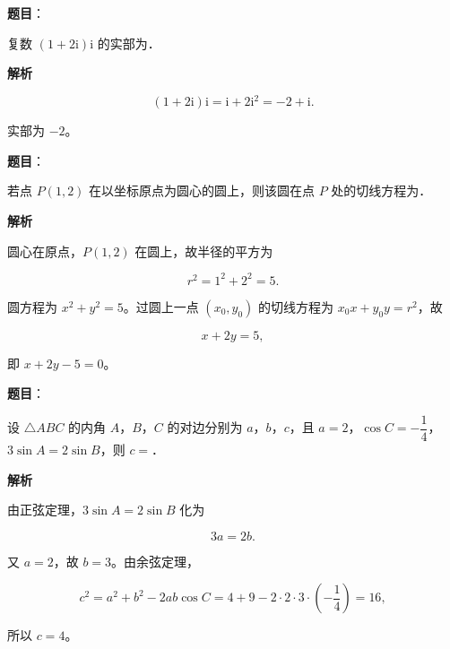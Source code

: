 \begin{answer}

\textbf{题目}：

复数 $(1+2\mathrm{i})\mathrm{i}$ 的实部为\gkblank{}．

\textbf{解析}

\nopagebreak[4]
\[
(1+2\mathrm{i})\mathrm{i}=\mathrm{i}+2\mathrm{i}^{2}=-2+\mathrm{i}.
\]

实部为 $-2$。


\end{answer}
\begin{answer}

\textbf{题目}：

若点 $P(1,2)$ 在以坐标原点为圆心的圆上，则该圆在点 $P$ 处的切线方程为\gkblank{}．

\textbf{解析}

圆心在原点，$P(1,2)$ 在圆上，故半径的平方为

\nopagebreak[4]
\[
r^{2}=1^{2}+2^{2}=5.
\]

圆方程为 $x^{2}+y^{2}=5$。过圆上一点 $(x_{0},y_{0})$ 的切线方程为 $x_{0}x+y_{0}y=r^{2}$，故

\nopagebreak[4]
\[
x+2y=5,
\]

即 $x+2y-5=0$。


\end{answer}
\begin{answer}

\textbf{题目}：

设 $\triangle ABC$ 的内角 $A$，$B$，$C$ 的对边分别为 $a$，$b$，$c$，且 $a=2$，$\cos C=-\dfrac{1}{4}$，$3\sin A=2\sin B$，则 $c=$\gkblank{}．

\textbf{解析}

由正弦定理，$3\sin A=2\sin B$ 化为

\nopagebreak[4]
\[
3a=2b.
\]

又 $a=2$，故 $b=3$。由余弦定理，

\nopagebreak[4]
\[
c^{2}=a^{2}+b^{2}-2ab\cos C
=4+9-2\cdot 2\cdot 3\cdot\left(-\frac{1}{4}\right)
=16,
\]

所以 $c=4$。


\end{answer}
